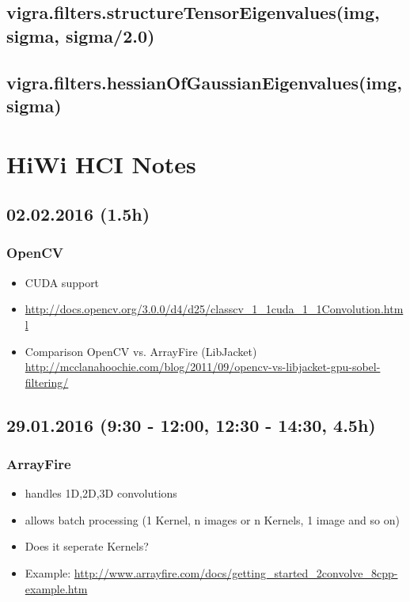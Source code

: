 \documentclass[12pt,a4paper]{article}
\begin{document}
  \subsection{vigra.filters.structureTensorEigenvalues(img, sigma, sigma/2.0)}
  \subsection{vigra.filters.hessianOfGaussianEigenvalues(img, sigma)}


\section{HiWi HCI Notes}

\subsection{02.02.2016 (1.5h)}

  \subsubsection{OpenCV}
    \begin{itemize}
      \item CUDA support
      \item \url{http://docs.opencv.org/3.0.0/d4/d25/classcv_1_1cuda_1_1Convolution.html}
      \item Comparison OpenCV vs. ArrayFire (LibJacket) \url{http://mcclanahoochie.com/blog/2011/09/opencv-vs-libjacket-gpu-sobel-filtering/}
    \end{itemize}


\subsection{29.01.2016 (9:30 - 12:00, 12:30 - 14:30, 4.5h)}

  \subsubsection{ArrayFire}
    \begin{itemize}
      \item handles 1D,2D,3D convolutions
      \item allows batch processing (1 Kernel, n images or n Kernels, 1 image and so on)
      \item Does it seperate Kernels?
      \item Example: \url{http://www.arrayfire.com/docs/getting_started_2convolve_8cpp-example.htm}
    \end{itemize}
\end{document}
